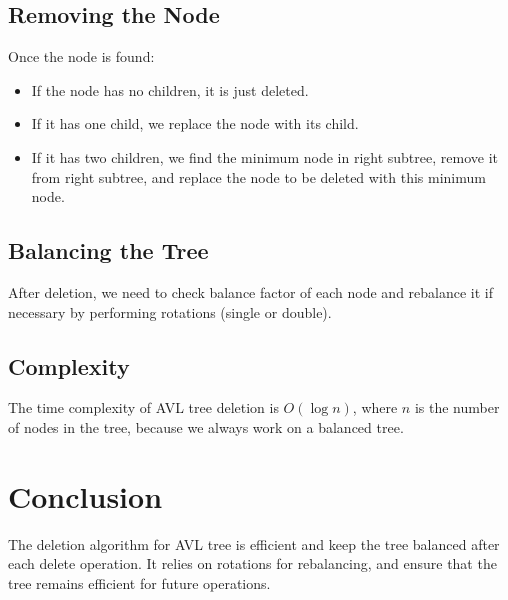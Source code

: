 \documentclass{article}
\begin{document}
\subsection{Removing the Node}
Once the node is found:
\begin{itemize}
    \item If the node has no children, it is just deleted.
    \item If it has one child, we replace the node with its child.
    \item If it has two children, we find the minimum node in right subtree, remove it from right subtree, and replace the node to be deleted with this minimum node.
\end{itemize}

\subsection{Balancing the Tree}
After deletion, we need to check balance factor of each node and rebalance it if necessary by performing rotations (single or double).

\subsection{Complexity}
The time complexity of AVL tree deletion is \( O(\log n) \), where \( n \) is the number of nodes in the tree, because we always work on a balanced tree.

\section{Conclusion}
The deletion algorithm for AVL tree is efficient and keep the tree balanced after each delete operation. It relies on rotations for rebalancing, and ensure that the tree remains efficient for future operations.
\end{document}
